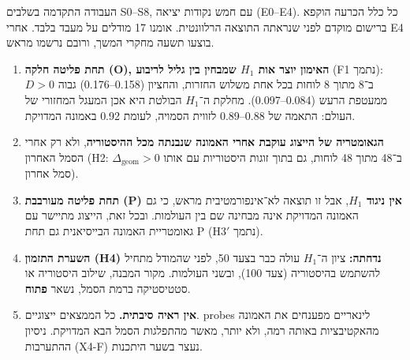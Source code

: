 \documentclass[12pt,a4paper]{article}
\newcommand{\en}[1]{\foreignlanguage{english}{#1}}   %
\newcommand{\dgeom}{\Delta_{\mathrm{geom}}}
\begin{document}
העבודה התקדמה בשלבים \en{S0--S8}, עם חמש נקודות יציאה (\en{E0--E4}). כל כלל הכרעה הוקפא ברישום מוקדם לפני שנראתה התוצאה הרלוונטית. אומנו 17 מודלים על מעבד בלבד. אחרי \en{E4} בוצעו תשעה מחקרי המשך, ורובם נרשמו מראש.

\begin{keybox}
\begin{enumerate}[leftmargin=*]
\item \textbf{תחת פליטה חלקה (O), האימון יוצר אות $H_1$ שמבחין בין גליל לריבוע} (F1 נתמך): $D>0$ ב־8 מתוך 8 לוחות בכל אחת משלוש החזרות, והחציון (0.158–0.176) גבוה ממעטפת הרעש (0.084–0.097). מחלקת ה־$H_1$ הבולטת היא אכן המעגל המחזורי של העולם: התאמה של 0.88–0.89 לזווית הסמויה, לעומת 0.92 באמונה המדויקת.
\item \textbf{הגאומטריה של הייצוג עוקבת אחרי האמונה שנבנתה מכל ההיסטוריה}, ולא רק אחרי הסמל האחרון (H2: $\dgeom>0$ ב־48 מתוך 48 לוחות, גם בתוך זוגות היסטוריות עם אותו סמל אחרון).
\item \textbf{תחת פליטה מעורבבת (P) אין ניגוד $H_1$}, אבל זו תוצאה לא־אינפורמטיבית מראש, כי גם האמונה המדויקת אינה מבחינה שם בין העולמות. ובכל זאת, הייצוג מתיישר עם גאומטריית האמונה הבייסיאנית גם תחת P (H3$'$ נתמך).
\item \textbf{השערת התזמון (H4) נדחתה:} ציון ה־$H_1$ עולה כבר בצעד 50, לפני שהמודל מתחיל להשתמש בהיסטוריה (צעד 100), ובשני העולמות. מקור המבנה, שילוב היסטוריה או סטטיסטיקה ברמת הסמל, נשאר \textbf{פתוח}.
\item \textbf{אין ראיה סיבתית.} כל הממצאים ייצוגיים. \en{probes} לינאריים מפענחים את האמונה מהאקטיבציות באותה רמה, ולא יותר, מאשר מהתפלגות הסמל הבא המדויקת. ניסיון ההתערבות (\en{X4-F}) נעצר בשער היתכנות.
\end{enumerate}
\end{keybox}
\end{document}
